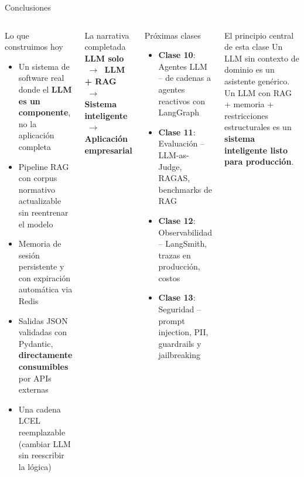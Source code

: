\documentclass[aspectratio=169]{beamer}
\begin{document}
\begin{frame}{Conclusiones}
  \begin{columns}
    \begin{block}{Lo que construimos hoy}
      \begin{itemize}
        \item Un sistema de software real donde el \textbf{LLM es un componente}, no la aplicación completa
        \item Pipeline RAG con corpus normativo actualizable sin reentrenar el modelo
        \item Memoria de sesión persistente y con expiración automática via Redis
        \item Salidas JSON validadas con Pydantic, \textbf{directamente consumibles} por APIs externas
        \item Una cadena LCEL reemplazable (cambiar LLM sin reescribir la lógica)
      \end{itemize}
    \end{block}
    \vspace{0.3em}
    \begin{exampleblock}{La narrativa completada}
      \centering
      \textbf{LLM solo}
      $\;\longrightarrow\;$
      \textbf{LLM + RAG}
      $\;\longrightarrow\;$
      \textbf{Sistema inteligente}
      $\;\longrightarrow\;$
      \textbf{Aplicación empresarial}
    \end{exampleblock}
    \begin{block}{Próximas clases}
      \begin{itemize}
        \item \textbf{Clase 10}: Agentes LLM -- de cadenas a agentes reactivos con LangGraph
        \item \textbf{Clase 11}: Evaluación -- LLM-as-Judge, RAGAS, benchmarks de RAG
        \item \textbf{Clase 12}: Observabilidad -- LangSmith, trazas en producción, costos
        \item \textbf{Clase 13}: Seguridad -- prompt injection, PII, guardrails y jailbreaking
      \end{itemize}
    \end{block}
    \vspace{0.3em}
    \begin{alertblock}{El principio central de esta clase}
      Un LLM sin contexto de dominio es un asistente genérico.
      Un LLM con RAG + memoria + restricciones estructurales
      es un \textbf{sistema inteligente listo para producción}.
    \end{alertblock}
  \end{columns}
\end{frame}
\end{document}
